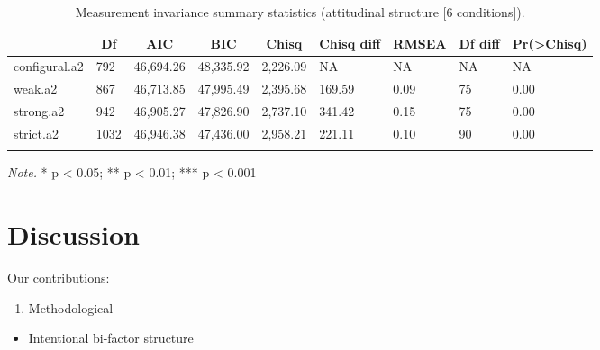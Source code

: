 \documentclass[
  man]{apa6}
\providecommand{\tightlist}{%
  \setlength{\itemsep}{0pt}\setlength{\parskip}{0pt}}
\begin{document}
\begin{table}[tbp]

\begin{center}
\begin{threeparttable}

\caption{\label{tab:measinv.siop2.att}Measurement invariance summary statistics (attitudinal structure [6 conditions]).}

\begin{tabular}{lllllllll}
\toprule
 & \multicolumn{1}{c}{Df} & \multicolumn{1}{c}{AIC} & \multicolumn{1}{c}{BIC} & \multicolumn{1}{c}{Chisq} & \multicolumn{1}{c}{Chisq diff} & \multicolumn{1}{c}{RMSEA} & \multicolumn{1}{c}{Df diff} & \multicolumn{1}{c}{Pr(>Chisq)}\\
\midrule
configural.a2 & 792 & 46,694.26 & 48,335.92 & 2,226.09 & NA & NA & NA & NA\\
weak.a2 & 867 & 46,713.85 & 47,995.49 & 2,395.68 & 169.59 & 0.09 & 75 & 0.00\\
strong.a2 & 942 & 46,905.27 & 47,826.90 & 2,737.10 & 341.42 & 0.15 & 75 & 0.00\\
strict.a2 & 1032 & 46,946.38 & 47,436.00 & 2,958.21 & 221.11 & 0.10 & 90 & 0.00\\
\bottomrule
\addlinespace
\end{tabular}

\begin{tablenotes}[para]
\normalsize{\textit{Note.} * p < 0.05; ** p < 0.01; *** p < 0.001}
\end{tablenotes}

\end{threeparttable}
\end{center}

\end{table}

\hypertarget{discussion}{%
\section{Discussion}\label{discussion}}

Our contributions:

\begin{enumerate}
\def\labelenumi{\arabic{enumi}.}
\tightlist
\item
  Methodological
\end{enumerate}

\begin{itemize}
\tightlist
\item
  Intentional bi-factor structure
\end{itemize}
\end{document}
